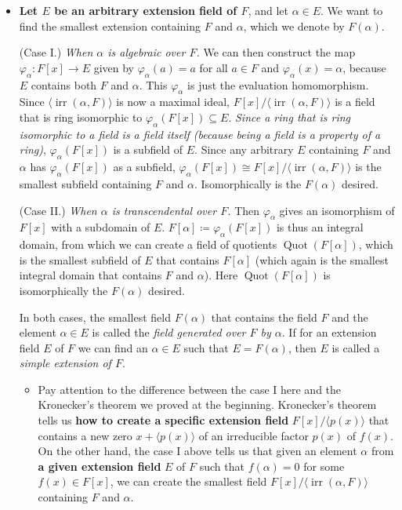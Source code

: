 \documentclass[11pt]{article}
\newcommand{\df}[1]{\textit{\textsf{#1}}}
\newcommand{\la}{\langle}
\newcommand{\ra}{\rangle}
\newcommand{\gen}[1]{\langle #1 \rangle}
\newcommand{\Quot}{\operatorname{Quot}} %
\newcommand{\irr}{\operatorname{irr}}
\renewcommand{\phi}{\varphi}
\renewcommand{\simeq}{\cong}
\begin{document}
\begin{itemize}
    \item \textbf{Let $E$ be an arbitrary extension field of $F$}, and let $\alpha \in E$. We want to find the smallest extension containing $F$ and $\alpha$, which we denote by $F(\alpha)$.
    
    (Case I.) \emph{When $\alpha$ is algebraic over $F$.} We can then construct the map $\phi_\alpha\colon F[x] \to E$ given by $\phi_\alpha(a) = a$ for all $a \in F$ and $\phi_\alpha(x) = \alpha$, because $E$ contains both $F$ and $\alpha$. This $\phi_\alpha$ is just the evaluation homomorphism. Since $\gen{\irr(\alpha,F)}$ is now a maximal ideal, $F[x]/\gen{\irr(\alpha,F)}$ is a field that is ring isomorphic to $\phi_\alpha(F[x]) \subseteq E$. \emph{Since a ring that is ring isomorphic to a field is a field itself (because being a field is a \emph{property} of a ring)}, $\phi_\alpha(F[x])$ is a subfield of $E$. Since any arbitrary $E$ containing $F$ and $\alpha$ has $\phi_\alpha(F[x])$ as a subfield, $\phi_\alpha(F[x]) \simeq F[x]/\la \irr(\alpha,F) \ra$ is the smallest subfield containing $F$ and $\alpha$. Isomorphically is the $F(\alpha)$ desired.
    
    (Case II.) \emph{When $\alpha$ is transcendental over $F$.} Then $\phi_\alpha$ gives an isomorphism of $F[x]$ with a subdomain of $E$. $F[\alpha] \coloneqq \phi_\alpha(F[x])$ is thus an integral domain, from which we can create a field of quotients $\Quot(F[\alpha])$, which is the smallest subfield of $E$ that contains $F[\alpha]$ (which again is the smallest integral domain that contains $F$ and $\alpha$). Here $\Quot(F[\alpha])$ is isomorphically the $F(\alpha)$ desired.
    
    In both cases, the smallest field $F(\alpha)$ that contains the field $F$ and the element $\alpha \in E$ is called the \df{field generated over $F$ by $\alpha$}. If for an extension field $E$ of $F$ we can find an $\alpha \in E$ such that $E = F(\alpha)$, then $E$ is called a \df{simple extension of $F$}.
    \begin{itemize}
        \item Pay attention to the difference between the case I here and the Kronecker's theorem we proved at the beginning. Kronecker's theorem tells us \textbf{how to create a specific extension field} $F[x]/\la p(x) \ra$ that contains a new zero $x + \la p(x) \ra$ of an irreducible factor $p(x)$ of $f(x)$. On the other hand, the case I above tells us that given an element $\alpha$ from \textbf{a given extension field} $E$ of $F$ such that $f(\alpha) = 0$ for some $f(x) \in F[x]$, we can create the smallest field $F[x]/\la \irr(\alpha,F) \ra$ containing $F$ and $\alpha$.
        

\end{itemize}
\end{itemize}
\end{document}

